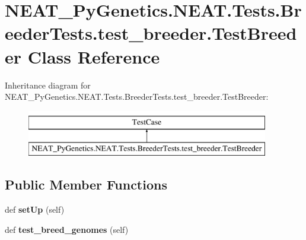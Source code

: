 \hypertarget{class_n_e_a_t___py_genetics_1_1_n_e_a_t_1_1_tests_1_1_breeder_tests_1_1test__breeder_1_1_test_breeder}{}\section{N\+E\+A\+T\+\_\+\+Py\+Genetics.\+N\+E\+A\+T.\+Tests.\+Breeder\+Tests.\+test\+\_\+breeder.\+Test\+Breeder Class Reference}
\label{class_n_e_a_t___py_genetics_1_1_n_e_a_t_1_1_tests_1_1_breeder_tests_1_1test__breeder_1_1_test_breeder}
Inheritance diagram for N\+E\+A\+T\+\_\+\+Py\+Genetics.\+N\+E\+A\+T.\+Tests.\+Breeder\+Tests.\+test\+\_\+breeder.\+Test\+Breeder\+:\begin{figure}[H]
\begin{center}
\leavevmode
\includegraphics[height=2.000000cm]{class_n_e_a_t___py_genetics_1_1_n_e_a_t_1_1_tests_1_1_breeder_tests_1_1test__breeder_1_1_test_breeder}
\end{center}
\end{figure}
\subsection*{Public Member Functions}
\begin{DoxyCompactItemize}
\item 
def {\bfseries set\+Up} (self)\hypertarget{class_n_e_a_t___py_genetics_1_1_n_e_a_t_1_1_tests_1_1_breeder_tests_1_1test__breeder_1_1_test_breeder_a8967d8a2eed942a90b58d7b1201cb46c}{}\label{class_n_e_a_t___py_genetics_1_1_n_e_a_t_1_1_tests_1_1_breeder_tests_1_1test__breeder_1_1_test_breeder_a8967d8a2eed942a90b58d7b1201cb46c}

\item 
def {\bfseries test\+\_\+breed\+\_\+genomes} (self)\hypertarget{class_n_e_a_t___py_genetics_1_1_n_e_a_t_1_1_tests_1_1_breeder_tests_1_1test__breeder_1_1_test_breeder_a8595b48bc5d70d810bbe5aa38fc3175f}{}\label{class_n_e_a_t___py_genetics_1_1_n_e_a_t_1_1_tests_1_1_breeder_tests_1_1test__breeder_1_1_test_breeder_a8595b48bc5d70d810bbe5aa38fc3175f}

\end{DoxyCompactItemize}
